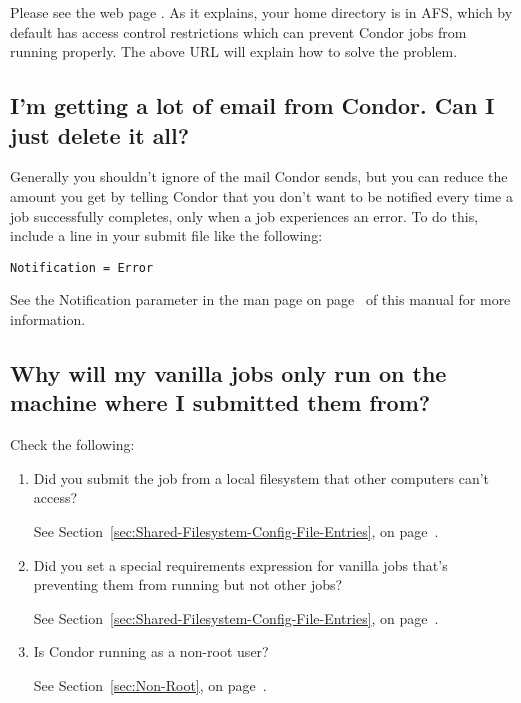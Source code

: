 Please see the web page .
As
it explains, your home directory is in AFS, which by default has
access control restrictions which can prevent Condor jobs from running
properly.
The above URL will explain how to solve the problem.

\subsection{I'm getting a lot of email from Condor.  Can I just delete it all?}

Generally you shouldn't ignore  of the mail Condor sends,
but you can reduce the amount you get by telling Condor that you don't
want to be notified every time a job successfully completes, only when
a job experiences an error.
To do this, include a line in your submit file like the following:

\begin{verbatim}Notification = Error\end{verbatim}

See the Notification parameter in the  man page on
page~\pageref{man-condor-submit-notification} of this manual for more
information.

\subsection{Why will my vanilla jobs only run on the machine where I
submitted them from?}

Check the following:
\begin {enumerate}

\item{Did you submit the job from a local filesystem that other
computers can't access?}

See Section~\ref{sec:Shared-Filesystem-Config-File-Entries}, on
page~\pageref{sec:Shared-Filesystem-Config-File-Entries}.

\item{Did you set a special requirements expression for 
vanilla jobs that's preventing them from running but not other jobs?}

See Section~\ref{sec:Shared-Filesystem-Config-File-Entries}, on
page~\pageref{sec:Shared-Filesystem-Config-File-Entries}.

\item{Is Condor running as a non-root user?}

See Section~\ref{sec:Non-Root}, on page~\pageref{sec:Non-Root}.

\end{enumerate}

